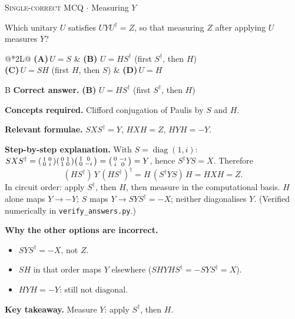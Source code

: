 \documentclass[11pt,a4paper]{article}
\newcommand{\optlabel}[1]{\textbf{(#1)}}
\newcommand{\correctlabel}[1]{\textcolor{okgreen}{\textbf{(#1)}\,\ding{51}}}
\newenvironment{qitem}[1]{\begin{list}{}{\setlength{\leftmargin}{3.3em}\setlength{\labelwidth}{3.1em}%
  \setlength{\labelsep}{0.2em}\setlength{\topsep}{3pt}\setlength{\parsep}{3pt}}\item[\textbf{Q.#1}\hfill]}{\end{list}}
\newcommand{\qsep}{\par\vspace{2pt}{\color{black!15}\hrule}\vspace{4pt}}
\newcommand{\qmeta}[2]{{\footnotesize\color{black!60}\textsc{#1} \;$\cdot$\; #2}\par}
\begin{document}
\begin{qitem}{35}
\qmeta{Single-correct MCQ}{Measuring $Y$}
Which unitary $U$ satisfies $UYU^\dagger = Z$, so that measuring $Z$ after applying $U$ measures $Y$?
\par\smallskip\noindent\begin{tabularx}{\linewidth}{@{}*{2}{L}@{}}
\optlabel{A}\,$U = S$ & \correctlabel{B}\,$U = HS^\dagger$ (first $S^\dagger$, then $H$) \\[3pt]
\optlabel{C}\,$U = SH$ (first $H$, then $S$) & \optlabel{D}\,$U = H$
\end{tabularx}
\end{qitem}
\begin{solbox}{B}
\textbf{\color{brand}Correct answer.} \textcolor{okgreen}{\textbf{(B)}} $U = HS^\dagger$ (first $S^\dagger$, then $H$)

\textbf{\color{brand}Concepts required.} Clifford conjugation of Paulis by $S$ and $H$.

\textbf{\color{brand}Relevant formulae.} $SXS^\dagger = Y$, $HXH = Z$, $HYH = -Y$.

\textbf{\color{brand}Step-by-step explanation.} With $S = \operatorname{diag}(1, i)$: $SXS^\dagger = \begin{psmallmatrix}1&0\\0&i\end{psmallmatrix}\begin{psmallmatrix}0&1\\1&0\end{psmallmatrix}\begin{psmallmatrix}1&0\\0&-i\end{psmallmatrix} = \begin{psmallmatrix}0&-i\\i&0\end{psmallmatrix} = Y$,
hence $S^\dagger YS = X$. Therefore
\[ (HS^\dagger)\,Y\,(HS^\dagger)^\dagger = H\,(S^\dagger YS)\,H = HXH = Z . \]
In circuit order: apply $S^\dagger$, then $H$, then measure in the computational basis. $H$ alone maps $Y \to -Y$; $S$ maps $Y \to SYS^\dagger = -X$;
neither diagonalises $Y$. (Verified numerically in \texttt{verify\_answers.py}.)

\textbf{\color{brand}Why the other options are incorrect.}
\begin{itemize}[leftmargin=2.4em, itemsep=1pt, topsep=2pt]
\item[\textbf{(A)}] $SYS^\dagger = -X$, not $Z$.
\item[\textbf{(C)}] $SH$ in that order maps $Y$ elsewhere ($SHYHS^\dagger = -SYS^\dagger = X$).
\item[\textbf{(D)}] $HYH = -Y$: still not diagonal.
\end{itemize}
\textbf{\color{brand}Key takeaway.} Measure $Y$: apply $S^\dagger$, then $H$.
\end{solbox}
\qsep
\end{document}
